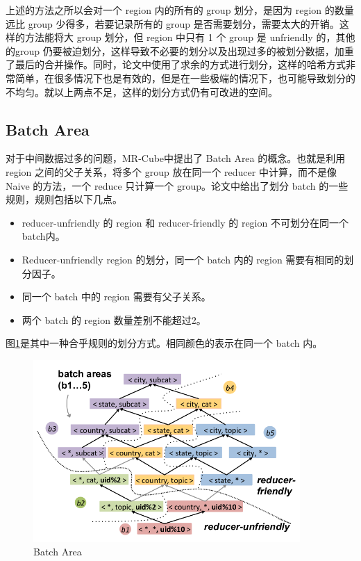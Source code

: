 上述的方法之所以会对一个 region 内的所有的 group 划分，是因为 region 的数量远比 group 少得多，若要记录所有的 group 是否需要划分，需要太大的开销。这样的方法能将大 group 划分，但 region 中只有 1 个 group 是 unfriendly 的，其他的group 仍要被迫划分，这样导致不必要的划分以及出现过多的被划分数据，加重了最后的合并操作。同时，论文中使用了求余的方式进行划分，这样的哈希方式非常简单，在很多情况下也是有效的，但是在一些极端的情况下，也可能导致划分的不均匀。就以上两点不足，这样的划分方式仍有可改进的空间。

\subsection{Batch Area}

对于中间数据过多的问题，MR-Cube中提出了 Batch Area 的概念。也就是利用 region 之间的父子关系，将多个 group 放在同一个 reducer 中计算，而不是像 Naive 的方法，一个 reduce 只计算一个 group。论文中给出了划分 batch 的一些规则，规则包括以下几点。
\begin{itemize}\setlength{\itemsep}{0pt}
\item reducer-unfriendly 的 region 和 reducer-friendly 的 region 不可划分在同一个batch内。
\item Reducer-unfriendly region 的划分，同一个 batch 内的 region 需要有相同的划分因子。
\item 同一个 batch 中的 region 需要有父子关系。
\item 两个 batch 的 region 数量差别不能超过2。
\end{itemize}

图\ref{batch_area}是其中一种合乎规则的划分方式。相同颜色的表示在同一个 batch 内。　

\begin{figure}[!htbp] 
\centering\includegraphics[width=4in]{picture/ch_datacube_mr/batch_area} 
\caption{Batch Area}\label{batch_area} 
\end{figure}

